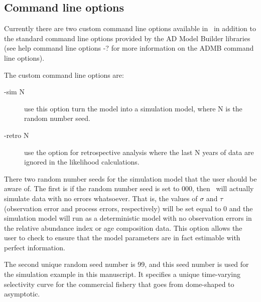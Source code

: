 


\begin{multicols}{2}

\subsection{Command line options}
Currently there are two custom command line options available in \iscam\ in addition to the standard command line options provided by the AD Model Builder libraries (see help command line options -? for more information on the ADMB command line options). 

The custom command line options are:
\begin{description}
\item[-sim N] use this option turn the model into a simulation model, where N is the random number seed.

\item[-retro N] use the option for retrospective analysis where the last N years of data are ignored in the likelihood calculations.
\end{description}

There two random number seeds for the simulation model that the user should be aware of.  The first is if the random number seed is set to 000, then \iscam\ will actually simulate data with no errors whatsoever.  That is, the values of $\sigma$ and $\tau$ (observation error and process errors, respectively) will be set equal to 0 and the simulation model will run as a deterministic model with no observation errors in the relative abundance index or age composition data.  This option allows the user to check to ensure that the model parameters are in fact estimable with perfect information.

The second unique random seed number is 99, and this seed number is used for the simulation example in this manuscript.  It specifies a unique time-varying selectivity curve for the commercial fishery that goes from dome-shaped to asymptotic.

\end{multicols}
